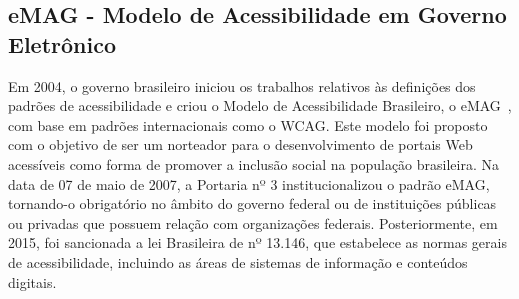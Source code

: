 \subsection{eMAG - Modelo de Acessibilidade em Governo Eletrônico}

Em 2004, o governo brasileiro iniciou os trabalhos relativos às definições dos padrões de acessibilidade e criou o Modelo de Acessibilidade Brasileiro, o eMAG~\cite{emag}, com base em padrões internacionais como o WCAG. 
Este modelo foi proposto com o objetivo de ser um norteador para o desenvolvimento de portais Web acessíveis como forma de promover a inclusão social na população brasileira. 
Na data de 07 de maio de 2007, a Portaria nº 3 institucionalizou o padrão eMAG, tornando-o obrigatório no âmbito do governo federal ou de instituições públicas ou privadas que possuem relação com organizações federais. Posteriormente, em 2015, foi sancionada a lei Brasileira de nº 13.146, que estabelece as normas gerais de acessibilidade, incluindo as áreas de sistemas de informação e conteúdos digitais.

